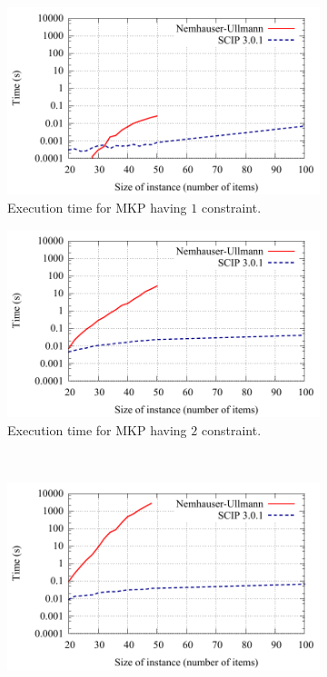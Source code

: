 \documentclass[a4paper]{article}
\newcommand{\scipnucaption}[1]{ Execution time for MKP having $#1$ constraint. }
\begin{document}

\begin{figure}[h]
  \centering
  \begin{subfigure}[t]{0.48\textwidth}
    \includegraphics[width=\textwidth]{../../../experiments/mkp-scip-nu/plots/scip-nu-1}
    \caption{\scipnucaption{1}}
    \label{fig:gull}
  \end{subfigure}%
  \quad
  \begin{subfigure}[t]{0.48\textwidth}
    \includegraphics[width=\textwidth]{../../../experiments/mkp-scip-nu/plots/scip-nu-2}
    \caption{\scipnucaption{2}}
    \label{fig:tiger}
  \end{subfigure}
  \\ \vspace{12pt}
  \begin{subfigure}[t]{0.48\textwidth}
    \includegraphics[width=\textwidth]{../../../experiments/mkp-scip-nu/plots/scip-nu-3}

\end{subfigure}
\end{figure}
\end{document}
